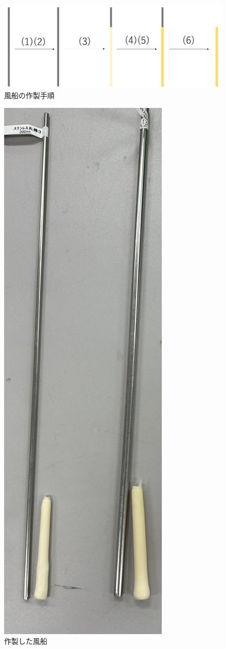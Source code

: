 \begin{figure}[!t]
  \centering  %
  \includegraphics[scale=0.35]{pic/tezyun.PNG}
  \caption{風船の作製手順}
\end{figure}
\begin{figure}[!t]
  \centering  %
  \includegraphics[scale=0.28]{pic/balloon.jpg}
  \caption{作製した風船}
\end{figure}

